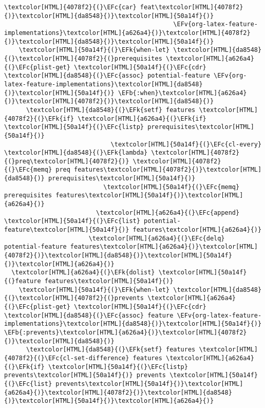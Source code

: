 \documentclass{scrartcl}
\newcommand{\EFk}[1]{\textcolor{EFk}{#1}} %
\newcommand{\EFb}[1]{\textcolor{EFb}{#1}} %
\newcommand{\EFc}[1]{\textcolor{EFc}{#1}} %
\newcommand{\EFv}[1]{\textcolor{EFv}{#1}} %
\begin{document}
\begin{enumerate}
\begin{Code}
\begin{Verbatim}[]
                                                  \textcolor[HTML]{4078f2}{(}\EFc{car} feat\textcolor[HTML]{4078f2}{)}\textcolor[HTML]{da8548}{)}\textcolor[HTML]{50a14f}{)}
                                              \EFv{org-latex-feature-implementations}\textcolor[HTML]{a626a4}{)}\textcolor[HTML]{4078f2}{)}\textcolor[HTML]{da8548}{)}\textcolor[HTML]{50a14f}{)}
    \textcolor[HTML]{50a14f}{(}\EFk{when-let} \textcolor[HTML]{da8548}{(}\textcolor[HTML]{4078f2}{(}prerequisites \textcolor[HTML]{a626a4}{(}\EFc{plist-get} \textcolor[HTML]{50a14f}{(}\EFc{cdr} \textcolor[HTML]{da8548}{(}\EFc{assoc} potential-feature \EFv{org-latex-feature-implementations}\textcolor[HTML]{da8548}{)}\textcolor[HTML]{50a14f}{)} \EFb{:when}\textcolor[HTML]{a626a4}{)}\textcolor[HTML]{4078f2}{)}\textcolor[HTML]{da8548}{)}
      \textcolor[HTML]{da8548}{(}\EFk{setf} features \textcolor[HTML]{4078f2}{(}\EFk{if} \textcolor[HTML]{a626a4}{(}\EFk{if} \textcolor[HTML]{50a14f}{(}\EFc{listp} prerequisites\textcolor[HTML]{50a14f}{)}
                             \textcolor[HTML]{50a14f}{(}\EFc{cl-every} \textcolor[HTML]{da8548}{(}\EFk{lambda} \textcolor[HTML]{4078f2}{(}preq\textcolor[HTML]{4078f2}{)} \textcolor[HTML]{4078f2}{(}\EFc{memq} preq features\textcolor[HTML]{4078f2}{)}\textcolor[HTML]{da8548}{)} prerequisites\textcolor[HTML]{50a14f}{)}
                           \textcolor[HTML]{50a14f}{(}\EFc{memq} prerequisites features\textcolor[HTML]{50a14f}{)}\textcolor[HTML]{a626a4}{)}
                         \textcolor[HTML]{a626a4}{(}\EFc{append} \textcolor[HTML]{50a14f}{(}\EFc{list} potential-feature\textcolor[HTML]{50a14f}{)} features\textcolor[HTML]{a626a4}{)}
                       \textcolor[HTML]{a626a4}{(}\EFc{delq} potential-feature features\textcolor[HTML]{a626a4}{)}\textcolor[HTML]{4078f2}{)}\textcolor[HTML]{da8548}{)}\textcolor[HTML]{50a14f}{)}\textcolor[HTML]{a626a4}{)}
  \textcolor[HTML]{a626a4}{(}\EFk{dolist} \textcolor[HTML]{50a14f}{(}feature features\textcolor[HTML]{50a14f}{)}
    \textcolor[HTML]{50a14f}{(}\EFk{when-let} \textcolor[HTML]{da8548}{(}\textcolor[HTML]{4078f2}{(}prevents \textcolor[HTML]{a626a4}{(}\EFc{plist-get} \textcolor[HTML]{50a14f}{(}\EFc{cdr} \textcolor[HTML]{da8548}{(}\EFc{assoc} feature \EFv{org-latex-feature-implementations}\textcolor[HTML]{da8548}{)}\textcolor[HTML]{50a14f}{)} \EFb{:prevents}\textcolor[HTML]{a626a4}{)}\textcolor[HTML]{4078f2}{)}\textcolor[HTML]{da8548}{)}
      \textcolor[HTML]{da8548}{(}\EFk{setf} features \textcolor[HTML]{4078f2}{(}\EFc{cl-set-difference} features \textcolor[HTML]{a626a4}{(}\EFk{if} \textcolor[HTML]{50a14f}{(}\EFc{listp} prevents\textcolor[HTML]{50a14f}{)} prevents \textcolor[HTML]{50a14f}{(}\EFc{list} prevents\textcolor[HTML]{50a14f}{)}\textcolor[HTML]{a626a4}{)}\textcolor[HTML]{4078f2}{)}\textcolor[HTML]{da8548}{)}\textcolor[HTML]{50a14f}{)}\textcolor[HTML]{a626a4}{)}

\end{Verbatim}
\end{Code}
\end{enumerate}
\end{document}
